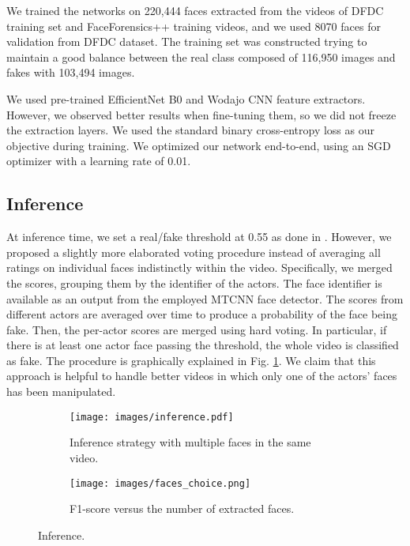 \documentclass[runningheads]{llncs}
\begin{document}
We trained the networks on 220,444 faces extracted from the videos of DFDC training set and FaceForensics++ training videos, and we used 8070 faces for validation from DFDC dataset. The training set was constructed trying to maintain a good balance between the real class composed of 116,950 images and fakes with 103,494 images. 

We used pre-trained EfficientNet B0 and Wodajo CNN feature extractors. However, we observed better results when fine-tuning them, so we did not freeze the extraction layers.
We used the standard binary cross-entropy loss as our objective during training. We optimized our network end-to-end, using an SGD optimizer with a learning rate of 0.01.



\subsection{Inference}
\label{sec:inference}
At inference time, we set a real/fake threshold at 0.55 as done in \cite{heo2021deepfake}. However, we proposed a slightly more elaborated voting procedure instead of averaging all ratings on individual faces indistinctly within the video. Specifically, we merged the scores, grouping them by the identifier of the actors. The face identifier is available as an output from the employed MTCNN face detector. The scores from different actors are averaged over time to produce a probability of the face being fake. Then, the per-actor scores are merged using hard voting. In particular, if there is at least one actor face passing the threshold, the whole video is classified as fake. The procedure is graphically explained in Fig. \ref{figure:evaluation_strategy}. 
We claim that this approach is helpful to handle better videos in which only one of the actors' faces has been manipulated.\begin{figure}[t]
\begin{subfigure}[b]{0.54\textwidth}
\centering
\texttt{[image: images/inference.pdf]}
\caption{Inference strategy with multiple faces in the same video.}
\label{figure:evaluation_strategy}
\end{subfigure}
\begin{subfigure}[b]{0.46\textwidth}
\centering
\texttt{[image: images/faces\_choice.png]}
\caption{F1-score versus the number of extracted faces.}
\label{figure:faces_choice}
\end{subfigure}
\caption{Inference.}
\end{figure}
\end{document}
